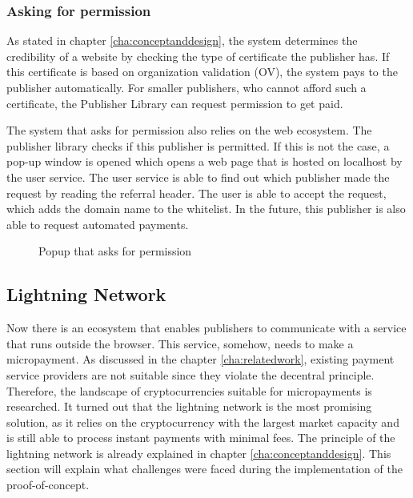 \subsubsection{Asking for permission}
As stated in chapter \ref{cha:conceptanddesign}, the system determines the credibility of a website by checking the type of certificate the publisher has. If this certificate is based on organization validation (OV), the system pays to the publisher automatically. For smaller publishers, who cannot afford such a certificate, the Publisher Library can request permission to get paid. 

The system that asks for permission also relies on the web ecosystem. The publisher library checks if this publisher is permitted. If this is not the case, a pop-up window is opened which opens a web page that is hosted on localhost by the user service. The user service is able to find out which publisher made the request by reading the referral header. The user is able to accept the request, which adds the domain name to the whitelist. In the future, this publisher is also able to request automated payments.

\begin{figure}[h!]
  \setlength{\fboxsep}{0pt}%
  \caption{Popup that asks for permission}
\end{figure}

\subsection{Lightning Network}
\label{sec:lightningnetwork}

Now there is an ecosystem that enables publishers to communicate with a service that runs outside the browser. This service, somehow, needs to make a micropayment. As discussed in the chapter \ref{cha:relatedwork}, existing payment service providers are not suitable since they violate the decentral principle. Therefore, the landscape of cryptocurrencies suitable for micropayments is researched. It turned out that the lightning network is the most promising solution, as it relies on the cryptocurrency with the largest market capacity and is still able to process instant payments with minimal fees. The principle of the lightning network is already explained in chapter \ref{cha:conceptanddesign}. This section will explain what challenges were faced during the implementation of the proof-of-concept.

